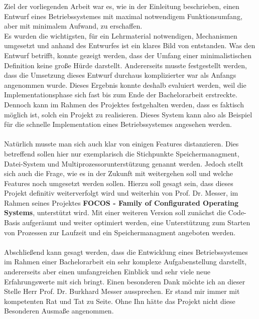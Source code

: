 Ziel der vorliegenden Arbeit war es, wie in der Einleitung beschrieben, einen Entwurf eines Betriebssystemes mit maximal notwendigem Funktionsumfang, aber mit minimalem Aufwand, zu erschaffen.\\
Es wurden die wichtigsten, f\"ur ein Lehrmaterial notwendigen, Mechanismen umgesetzt und anhand des Entwurfes ist ein klares Bild von \mops entstanden. Was den Entwurf betrifft, konnte gezeigt werden, dass der Umfang einer minimalistischen Definition keine gro\ss e H\"urde darstellt. Andererseits musste festgestellt werden, dass die Umsetzung dieses Entwurf durchaus komplizierter war als Anfangs angenommen wurde. Dieses Ergebnis konnte deshalb evaluiert werden, weil die Implementationsphase sich fast bis zum Ende der Bachelorarbeit erstreckte. Dennoch kann im Rahmen des Projektes festgehalten werden, dass es faktisch m\"oglich ist, solch ein Projekt zu realisieren. Dieses System kann also als Beispiel f\"ur die schnelle Implementation eines Betriebssystemes angesehen werden.\\\\
Nat\"urlich musste man sich auch klar von einigen Features distanzieren. Dies betreffend sollen hier nur exemplarisch die Stichpunkte Speichermanagment, Datei-System und Multiprozessorunterst\"utzung genannt werden. Jedoch stellt sich auch die Frage, wie es in der Zukunft mit \mops weitergehen soll und welche Features noch umgesetzt werden sollen. Hierzu soll gesagt sein, dass dieses Projekt definitiv weiterverfolgt wird und weiterhin von Prof. Dr. Messer, im Rahmen seines Projektes \textbf{FOCOS - Family of Configurated Operating Systems}, unterst\"utzt wird. Mit einer weiteren Version soll zun\"achst die Code-Basis aufger\"aumt und weiter optimiert werden, eine Unterst\"utzung zum Starten von Prozessen zur Laufzeit und ein Speichermanagment angeboten werden.\\\\
Abschlie\ss end kann gesagt werden, dass die Entwicklung eines Betriebssystemes im Rahmen einer Bachelorarbeit ein sehr komplexe Aufgabenstellung darstellt, andererseits aber einen umfangreichen Einblick und sehr viele neue Erfahrungswerte mit sich bringt. Einen besonderen Dank m\"ochte ich an dieser Stelle Herr Prof. Dr. Burkhard Messer aussprechen. Er stand mir immer mit kompetenten Rat und Tat zu Seite. Ohne Ihn h\"atte das Projekt nicht diese Besonderen Ausma\ss e angenommen.
\nocite{clanguageII}